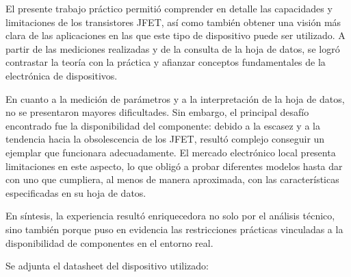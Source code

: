 \documentclass[chaptersright]{informeutn}
\begin{document}
El presente trabajo práctico permitió comprender en detalle las capacidades y limitaciones de los transistores JFET, así como también obtener una visión más clara de las aplicaciones en las que este tipo de dispositivo puede ser utilizado. A partir de las mediciones realizadas y de la consulta de la hoja de datos, se logró contrastar la teoría con la práctica y afianzar conceptos fundamentales de la electrónica de dispositivos.  

En cuanto a la medición de parámetros y a la interpretación de la hoja de datos, no se presentaron mayores dificultades. Sin embargo, el principal desafío encontrado fue la disponibilidad del componente: debido a la escasez y a la tendencia hacia la obsolescencia de los JFET, resultó complejo conseguir un ejemplar que funcionara adecuadamente. El mercado electrónico local presenta limitaciones en este aspecto, lo que obligó a probar diferentes modelos hasta dar con uno que cumpliera, al menos de manera aproximada, con las características especificadas en su hoja de datos.  

En síntesis, la experiencia resultó enriquecedora no solo por el análisis técnico, sino también porque puso en evidencia las restricciones prácticas vinculadas a la disponibilidad de componentes en el entorno real.

Se adjunta el datasheet del dispositivo utilizado:


\end{document}
